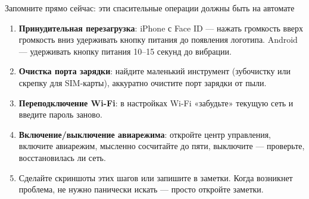 \begin{tcbpractice}{Запомните прямо сейчас: эти спасительные операции должны быть на автомате}
\begin{enumerate}
  \item \textbf{Принудительная перезагрузка}: iPhone с Face ID — нажать громкость вверх громкость вниз удерживать кнопку питания до появления логотипа. Android — удерживать кнопку питания 10–15 секунд до вибрации.
  \item \textbf{Очистка порта зарядки}: найдите маленький инструмент (зубочистку или скрепку для SIM-карты), аккуратно очистите порт зарядки от пыли.
  \item \textbf{Переподключение Wi-Fi}: в настройках Wi-Fi «забудьте» текущую сеть и введите пароль заново.
  \item \textbf{Включение/выключение авиарежима}: откройте центр управления, включите авиарежим, мысленно сосчитайте до пяти, выключите — проверьте, восстановилась ли сеть.
  \item Сделайте скриншоты этих шагов или запишите в заметки. Когда возникнет проблема, не нужно панически искать — просто откройте заметки.
\end{enumerate}

\end{tcbpractice}
